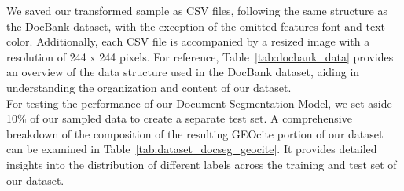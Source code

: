 We saved our transformed sample as CSV files, following the same structure as the DocBank dataset, with the exception of the omitted features font and text color. Additionally, each CSV file is accompanied by a resized image with a resolution of 244 x 244 pixels. For reference, Table~\ref{tab:docbank_data} provides an overview of the data structure used in the DocBank dataset, aiding in understanding the organization and content of our dataset.\\
For testing the performance of our Document Segmentation Model, we set aside 10\% of our sampled data to create a separate test set. A comprehensive breakdown of the composition of the resulting GEOcite portion of our dataset can be examined in Table~\ref{tab:dataset_docseg_geocite}. It provides detailed insights into the distribution of different labels across the training and test set of our dataset.

